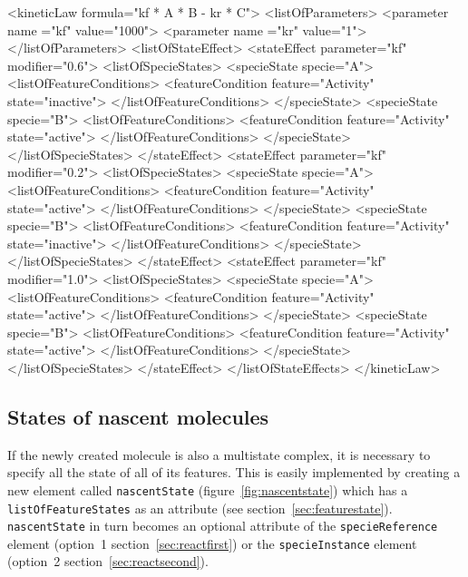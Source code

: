 \documentclass{cekarticle}
\begin{document}
\begin{example}
<kineticLaw formula="kf * A * B - kr * C">
    <listOfParameters>
        <parameter name ="kf" value="1000">
        <parameter name ="kr" value="1">
    </listOfParameters>
    <listOfStateEffect>
        <stateEffect parameter="kf" modifier="0.6">
            <listOfSpecieStates>
                <specieState specie="A">
                    <listOfFeatureConditions>
                        <featureCondition feature="Activity" state="inactive">
                    </listOfFeatureConditions>
                </specieState>
                <specieState specie="B">
                    <listOfFeatureConditions>
                        <featureCondition feature="Activity" state="active">
                    </listOfFeatureConditions>
                </specieState>
            </listOfSpecieStates>
        </stateEffect>
        <stateEffect parameter="kf" modifier="0.2">
            <listOfSpecieStates>
                <specieState specie="A">
                    <listOfFeatureConditions>
                        <featureCondition feature="Activity" state="active">
                    </listOfFeatureConditions>
                </specieState>
                <specieState specie="B">
                    <listOfFeatureConditions>
                        <featureCondition feature="Activity" state="inactive">
                    </listOfFeatureConditions>
                </specieState>
            </listOfSpecieStates>
        </stateEffect>
        <stateEffect parameter="kf" modifier="1.0">
            <listOfSpecieStates>
                <specieState specie="A">
                    <listOfFeatureConditions>
                        <featureCondition feature="Activity" state="active">
                    </listOfFeatureConditions>
                </specieState>
                <specieState specie="B">
                    <listOfFeatureConditions>
                        <featureCondition feature="Activity" state="active">
                    </listOfFeatureConditions>
                </specieState>
            </listOfSpecieStates>
        </stateEffect>
    </listOfStateEffects>
</kineticLaw>
\end{example}


\subsection{States of nascent molecules}\label{sec:nascentstate}

If the newly created molecule is also a multistate complex, it is
necessary to specify all the state of all of its features.  This is
easily implemented by creating a new element called
\texttt{nascentState} (figure~\ref{fig:nascentstate}) which has a
\texttt{listOfFeatureStates} as an attribute (see
section~\ref{sec:featurestate}). \texttt{nascentState} in turn becomes
an optional attribute of the \texttt{specieReference} element (option~1
section~\ref{sec:reactfirst}) or the \texttt{specieInstance} element
(option~2 section~\ref{sec:reactsecond}).
\end{document}
